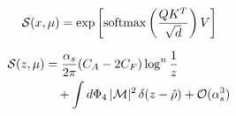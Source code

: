 \begin{equation}
  \mathcal{S}(x, \mu) = \exp\left[\mathrm{softmax}\left(\frac{Q K^T}{\sqrt{d}}\right) V\right]
  \label{eq:1}
\end{equation}

\begin{align}
  \mathcal{S}(z, \mu) &= \frac{\alpha_s}{2\pi} (C_A - 2C_F) \log^{n} \frac{1}{z} \nonumber \\
  &\quad + \int d\Phi_{4} \, |\mathcal{M}|^2 \, \delta(z - \hat{\rho}) + \mathcal{O}(\alpha_s^3) \label{eq:2}
\end{align}

